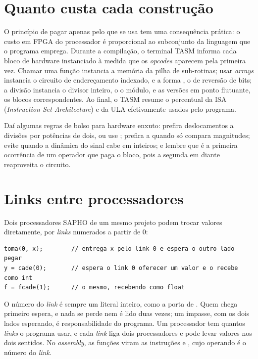 \section{Quanto custa cada construção}
\label{sec:custo-hardware}

O princípio de pagar apenas pelo que se usa tem uma consequência prática: o custo em FPGA do processador é proporcional ao subconjunto da linguagem que o programa emprega. Durante a compilação, o terminal TASM informa cada bloco de hardware instanciado à medida que os \textit{opcodes} aparecem pela primeira vez. Chamar uma função instancia a memória da pilha de sub-rotinas; usar \textit{arrays} instancia o circuito de endereçamento indexado, e a forma \code{x[k)}, o de reversão de bits; a divisão instancia o divisor inteiro, o \code{\%} o módulo, e as versões em ponto flutuante, os blocos correspondentes. Ao final, o TASM resume o percentual da ISA (\textit{Instruction Set Architecture}) e da ULA efetivamente usados pelo programa.

Daí algumas regras de bolso para hardware enxuto: prefira deslocamentos a divisões por potências de dois, ou use ; prefira  a  quando só compara magnitudes; evite  quando a dinâmica do sinal cabe em inteiros; e lembre que é a primeira ocorrência de um operador que paga o bloco, pois a segunda em diante reaproveita o circuito.

\section{Links entre processadores}
\label{sec:links}

Dois processadores SAPHO de um mesmo projeto podem trocar valores diretamente, por \textit{links} numerados a partir de 0:

\begin{lstlisting}[style=cmm]
toma(0, x);        // entrega x pelo link 0 e espera o outro lado pegar
y = cade(0);       // espera o link 0 oferecer um valor e o recebe como int
f = fcade(1);      // o mesmo, recebendo como float
\end{lstlisting}

O número do \textit{link} é sempre um literal inteiro, como a porta de . Quem chega primeiro espera, e nada se perde nem é lido duas vezes; um impasse, com os dois lados esperando, é responsabilidade do programa. Um processador tem quantos \textit{links} o programa usar, e cada \textit{link} liga dois processadores e pode levar valores nos dois sentidos. No \textit{assembly}, as funções viram as instruções  e , cujo operando é o número do \textit{link}.

